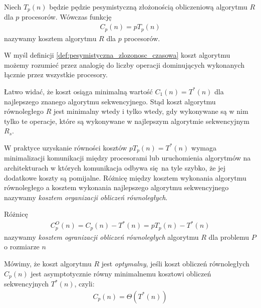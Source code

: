 \begin{definicja}\label{def:cost}
Niech \(T_{p}(n)\) będzie pędzie pesymistyczną złożonością obliczeniową algorytmu \(R\) dla \(p\) procesorów. Wówczas funkcję
\begin{align}
C_{p}(n) = p T_{p}(n)
\end{align}
nazywamy kosztem algorytmu \(R\) dla \(p\) procesorów.
\end{definicja}

W myśl definicji \ref{def:pesymistyczna_zlozonosc_czasowa} koszt algorytmu możemy rozumieć przez analogię do liczby operacji dominujących wykonanych łącznie przez wszystkie procesory. 

\begin{wniosek}
Łatwo widać, że koszt osiąga minimalną wartość \(C_{1}(n) = T^{*}(n)\) dla  najlepszego znanego algorytmu sekwencyjnego. Stąd koszt algorytmu równoległego \(R\) jest minimalny wtedy i tylko wtedy, gdy wykonywane są w nim tylko te operacje, które są wykonywane w najlepszym algorytmie sekwencyjnym \(R_s\).
\end{wniosek}

\begin{uwaga}
W praktyce uzyskanie równości kosztów \(pT_{p}(n)=T^{*}(n)\) wymaga minimalizacji komunikacji między procesorami lub uruchomienia algorytmów na architekturach w których komunikacja odbywa się na tyle szybko, że jej dodatkowe koszty są pomijalne. Różnicę między kosztem wykonania algorytmu równoległego a kosztem wykonania najlepszego algorytmu sekwencyjnego nazywamy \emph{kosztem organizacji obliczeń równoległych}.
\end{uwaga}

\begin{definicja}
Różnicę 
\begin{align}
C_{p}^{O}(n) = C_{p}(n) - T^{*}(n) = pT_{p}(n) - T^{*}(n)
\end{align}
nazywamy \emph{kosztem ogranizacji obliczeń równoległych} algorytmu \(R\) dla problemu \(P\) o rozmiarze \(n\)
\end{definicja}

\begin{definicja}\label{def:cost-optimal}
Mówimy, że koszt algorytmu \(R\) jest \emph{optymalny}, jeśli koszt obliczeń równoległych \(C_{p}(n)\) jest asymptotycznie równy minimalnemu kosztowi obliczeń sekwencyjnych \(T^{*}(n)\), czyli:
\begin{align}
C_{p}(n) = \Theta(T^{*}(n))
\end{align}
\end{definicja}